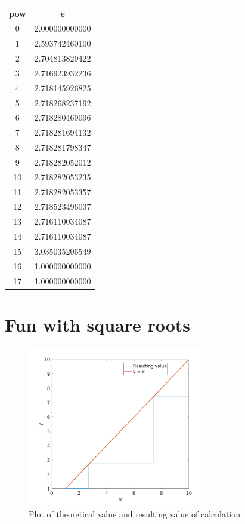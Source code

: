 \documentclass[a4paper, 12pt]{article}
\begin{document}
\begin{table}[H]
\centering
\begin{tabular}{|c|c|}
\hline
\textbf{pow} & \textbf{e}     \\ \hline
0            & 2.000000000000 \\ \hline
1            & 2.593742460100 \\ \hline
2            & 2.704813829422 \\ \hline
3            & 2.716923932236 \\ \hline
4            & 2.718145926825 \\ \hline
5            & 2.718268237192 \\ \hline
6            & 2.718280469096 \\ \hline
7            & 2.718281694132 \\ \hline
8            & 2.718281798347 \\ \hline
9            & 2.718282052012 \\ \hline
10           & 2.718282053235 \\ \hline
11           & 2.718282053357 \\ \hline
12           & 2.718523496037 \\ \hline
13           & 2.716110034087 \\ \hline
14           & 2.716110034087 \\ \hline
15           & 3.035035206549 \\ \hline
16           & 1.000000000000 \\ \hline
17           & 1.000000000000 \\ \hline
\end{tabular}
\end{table}



\section{Fun with square roots}

\begin{figure}[H]
	\centering
	\includegraphics[width=0.7\textwidth]{q6.png}
	\caption{Plot of theoretical value and resulting value of calculation}
	\centering
	\label{fig:2a_pd}
\end{figure}
\end{document}
